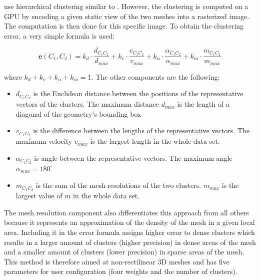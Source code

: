 
\citet{Peng12} use hierarchical clustering similar to \citet{Telea99}. However, the clustering is computed on a GPU by encoding a given static view of the two meshes into a rasterized image. The computation is then done for this specific image. To obtain the clustering error, a very simple formula is used:

\begin{equation} \label{eq:clustering_error}
\bm{e}(C_1,C_2) = k_d \cdot \frac{d_{C_1C_2}}{d_{max}} + k_v \cdot \frac{v_{C_1C_2}}{v_{max}} + k_\alpha \cdot \frac{\alpha_{C_1C_2}}{\alpha_{max}} + k_m \cdot \frac{m_{C_1C_2}}{m_{max}}
\end{equation}

where \(k_d + k_v + k_\alpha + k_m = 1\). The other components are the following:

\begin{itemize}
\item \(d_{C_1C_2}\) is the Euclidean distance between the positions of the representative vectors of the clusters. The maximum distance \(d_{max}\) is the length of a diagonal of the geometry's bounding box
\item \(v_{C_1C_2}\) is the difference between the lengths of the representative vectors. The maximum velocity \(v_{max}\) is the largest length in the whole data set.
\item \(\alpha_{C_1C_2}\) is angle between the representative vectors. The maximum angle \(\alpha_{max} = 180^\circ\)
\item \(m_{C_1C_2}\) is the sum of the mesh resolutions of the two clusters. \(m_{max}\) is the largest value of \(m\) in the whole data set.
\end{itemize}

The mesh resolution component also differentiates this approach from all others because it represents an approximation of the density of the mesh in a given local area. Including it in the error formula assigns higher error to dense clusters which results in a larger amount of clusters (higher precision) in dense areas of the mesh and a smaller amount of clusters (lower precision) in sparse areas of the mesh. This method is therefore aimed at non-rectilinear 3D meshes and has five parameters for user configuration (four weights and the number of clusters).
